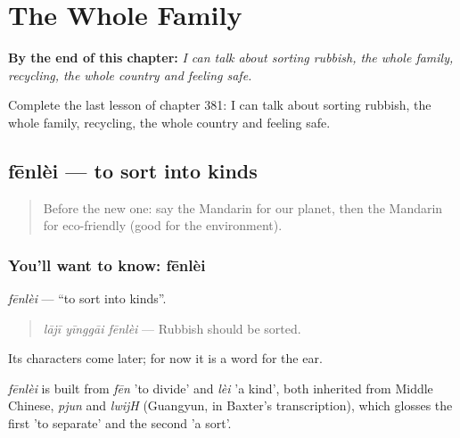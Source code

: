 
\chapter{The Whole Family}
\label{ch:zh-the-whole-family}

\begin{chapteropening}
\textbf{By the end of this chapter:} \emph{I can talk about sorting rubbish, the whole family, recycling, the whole country and feeling safe.}

Complete the last lesson of chapter 381: I can talk about sorting rubbish, the whole family, recycling, the whole country and feeling safe.
\end{chapteropening}

\section[fēnlèi]{fēnlèi — to sort into kinds}

\label{lesson:ZH-C381-fenlei}



\begin{quote}
Before the new one: say the Mandarin for our planet, then the Mandarin for eco-friendly (good for the environment).
\end{quote}

\subsection*{You'll want to know: fēnlèi}
\emph{fēnlèi} — \textquotedblleft{}to sort into kinds\textquotedblright{}.

\begin{quote}
\emph{lājī yīnggāi fēnlèi} — Rubbish should be sorted.
\end{quote}

Its characters come later; for now it is a word for the ear.

\begin{cousinweb}
\emph{fēnlèi} is built from \emph{fēn} 'to divide' and \emph{lèi} 'a kind', both inherited from Middle Chinese, \emph{pjun} and \emph{lwijH} (Guangyun, in Baxter's transcription), which glosses the first 'to separate' and the second 'a sort'.
\end{cousinweb}

